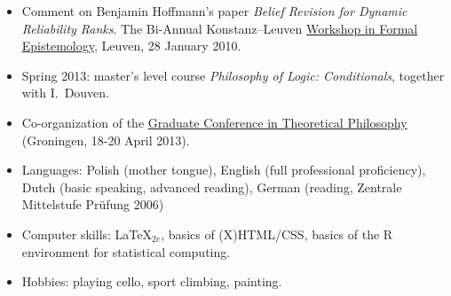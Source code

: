 \documentclass[a4paper,12pt]{article}
\begin{document}
\begin{small}
\begin{itemize}
  \item Comment on Benjamin Hoffmann's paper \emph{Belief Revision for
      Dynamic Reliability Ranks}. The Bi-Annual Konstanz--Leuven
    \href{http://formalphilosophy.org/node/580}{Workshop in Formal
      Epistemology}, Leuven, 28 January 2010.
  \end{itemize}

  



  
  
  \begin{itemize}
  \item Spring 2013: master's level course \emph{Philosophy of Logic:
      Conditionals}, together with I.~Douven.
  \end{itemize}

  
  \begin{itemize}
  \item Co-organization of the
    \href{http://www.philos.rug.nl/GCTP2013/}{Graduate Conference in
      Theoretical Philosophy} (Groningen, 18-20 April 2013).
  \end{itemize}


  \begin{itemize}
  \item Languages: Polish (mother tongue), English (full professional proficiency), Dutch
    (basic speaking, advanced reading), German (reading, Zentrale
    Mittelstufe Pr\"ufung 2006)
  \item Computer skills: \LaTeX$_{2e}$, basics of
    (X)HTML/CSS, basics of the R environment for statistical
    computing.

  \item Hobbies: playing cello, sport climbing, painting.
  \end{itemize}


\end{small}
\end{document}
